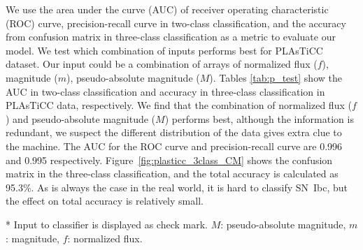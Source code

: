 \documentclass[useamsfonts]{pasj01}
\begin{document}
We use the area under the curve (AUC) of receiver operating characteristic (ROC) curve, precision-recall curve in two-class classification, and the accuracy from confusion matrix in three-class classification as a metric to evaluate our model.
We test which combination of inputs performs best for PLAsTiCC dataset. Our input could be a combination of arrays of normalized flux ($f$), magnitude ($m$), pseudo-absolute magnitude ($M$).
Tables \ref{tab:p_test} show the AUC in two-class classification and accuracy in three-class classification in PLAsTiCC data, respectively.
We find that the combination of normalized flux ($f$) and pseudo-absolute magnitude ($M$) performs best, although the information is redundant, we suspect the different distribution of the data gives extra clue to the machine.
The AUC for the ROC curve and precision-recall curve are 0.996 and 0.995 respectively.
Figure\ \ref{fig:plasticc_3class_CM} shows the confusion matrix in the three-class classification, and the total accuracy is calculated as 95.3\%.
As is always the case in the real world, it is hard to classify SN~Ibc, but the effect on total accuracy is relatively small.
%
\begin{table}[htbp]
\label{tab:p_test}
\begin{tabnote}
* Input to classifier is displayed as check mark. $M$: pseudo-absolute magnitude, $m$: magnitude, $f$: normalized flux.
\end{tabnote}
\end{table}
\end{document}
